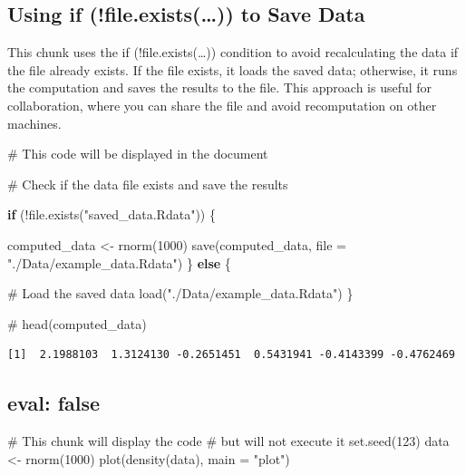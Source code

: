 \documentclass[
  journal,
]{IEEEtran}%
\newenvironment{Shaded}{\begin{snugshade}}{\end{snugshade}}
\newcommand{\AttributeTok}[1]{\textcolor[rgb]{0.40,0.45,0.13}{#1}}
\newcommand{\CommentTok}[1]{\textcolor[rgb]{0.37,0.37,0.37}{#1}}
\newcommand{\ControlFlowTok}[1]{\textcolor[rgb]{0.00,0.23,0.31}{\textbf{#1}}}
\newcommand{\DecValTok}[1]{\textcolor[rgb]{0.68,0.00,0.00}{#1}}
\newcommand{\FunctionTok}[1]{\textcolor[rgb]{0.28,0.35,0.67}{#1}}
\newcommand{\NormalTok}[1]{\textcolor[rgb]{0.00,0.23,0.31}{#1}}
\newcommand{\OtherTok}[1]{\textcolor[rgb]{0.00,0.23,0.31}{#1}}
\newcommand{\SpecialCharTok}[1]{\textcolor[rgb]{0.37,0.37,0.37}{#1}}
\newcommand{\StringTok}[1]{\textcolor[rgb]{0.13,0.47,0.30}{#1}}
\begin{document}
\subsection{Using if (!file.exists(\ldots)) to Save
Data}\label{using-if-file.exists-to-save-data}

This chunk uses the if (!file.exists(\ldots)) condition to avoid
recalculating the data if the file already exists. If the file exists,
it loads the saved data; otherwise, it runs the computation and saves
the results to the file. This approach is useful for collaboration,
where you can share the file and avoid recomputation on other machines.

\begin{Shaded}
\begin{Highlighting}[]
\CommentTok{\# This code will be displayed in the document}

\CommentTok{\# Check if the data file exists and save the results}

\ControlFlowTok{if}\NormalTok{ (}\SpecialCharTok{!}\FunctionTok{file.exists}\NormalTok{(}\StringTok{"saved\_data.Rdata"}\NormalTok{)) \{}

\NormalTok{  computed\_data }\OtherTok{\textless{}{-}} \FunctionTok{rnorm}\NormalTok{(}\DecValTok{1000}\NormalTok{)}
  \FunctionTok{save}\NormalTok{(computed\_data, }\AttributeTok{file =} \StringTok{"./Data/example\_data.Rdata"}\NormalTok{)}
\NormalTok{\} }\ControlFlowTok{else}\NormalTok{ \{}
  
  \CommentTok{\# Load the saved data}
  \FunctionTok{load}\NormalTok{(}\StringTok{"./Data/example\_data.Rdata"}\NormalTok{)}
\NormalTok{\}}

\CommentTok{\# }
\FunctionTok{head}\NormalTok{(computed\_data)}
\end{Highlighting}
\end{Shaded}

\begin{verbatim}
[1]  2.1988103  1.3124130 -0.2651451  0.5431941 -0.4143399 -0.4762469
\end{verbatim}

\subsection{eval: false}\label{eval-false}

\begin{Shaded}
\begin{Highlighting}[]
\CommentTok{\# This chunk will display the code}
\CommentTok{\# but will not execute it}
\FunctionTok{set.seed}\NormalTok{(}\DecValTok{123}\NormalTok{)}
\NormalTok{data }\OtherTok{\textless{}{-}} \FunctionTok{rnorm}\NormalTok{(}\DecValTok{1000}\NormalTok{)}
\FunctionTok{plot}\NormalTok{(}\FunctionTok{density}\NormalTok{(data), }\AttributeTok{main =} \StringTok{"plot"}\NormalTok{)}
\end{Highlighting}
\end{Shaded}
\end{document}
